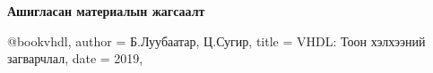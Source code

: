 \addchaptertocentry{\constantsname}
\textbf{Ашигласан материалын жагсаалт} %

 @book{vhdl,
	author = {Б.Луубаатар, Ц.Сугир},
	title = {VHDL: Тоон хэлхээний загварчлал},
	date = {2019},
}
